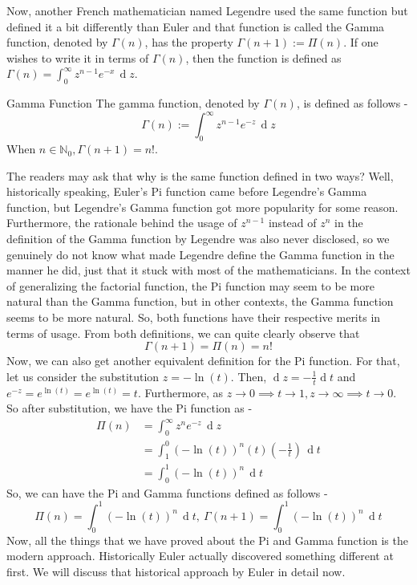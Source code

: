 \noindent Now, another French mathematician named Legendre used the same function but defined it a bit differently than Euler and that function is called the Gamma function, denoted by $\Gamma(n)$, has the property $\Gamma(n+1):=\Pi(n)$. If one wishes to write it in terms of $\Gamma(n)$, then the function is defined as $\Gamma(n)=\int_0^{\infty}z^{n-1}e^{-x}\,\operatorname{d}z$.
\begin{Definition}{Gamma Function}\label{gamma_function}
	The gamma function, denoted by $\Gamma(n)$, is defined as follows - $$\Gamma(n):=\int_0^{\infty} z^{n-1}e^{-z}\,\operatorname{d}z$$ When $n\in\mathbb{N}_0,\Gamma(n+1)=n!$.
\end{Definition}
\noindent The readers may ask that why is the same function defined in two ways? Well, historically speaking, Euler's Pi function came before Legendre's Gamma function, but Legendre's Gamma function got more popularity for some reason. Furthermore, the rationale behind the usage of $z^{n-1}$ instead of $z^n$ in the definition of the Gamma function by Legendre was also never disclosed, so we genuinely do not know what made Legendre define the Gamma function in the manner he did, just that it stuck with most of the mathematicians. In the context of generalizing the factorial function, the Pi function may seem to be more natural than the Gamma function, but in other contexts, the Gamma function seems to be more natural. So, both functions have their respective merits in terms of usage. From both definitions, we can quite clearly observe that $$\boxed{\Gamma(n+1)=\Pi(n)=n!}$$
Now, we can also get another equivalent definition for the Pi function. For that, let us consider the substitution $z=-\ln(t)$. Then, $\operatorname{d}z=-\frac{1}{t}\operatorname{d}t$ and $e^{-z}=e^{\ln(t)}=e^{\ln(t)}=t$. Furthermore, as $z\to0\implies t\to1,z\to\infty\implies t\to 0$. So after substitution, we have the Pi function as -
\begin{align*}
	\Pi(n)&=\int_0^{\infty}z^ne^{-z}\,\operatorname{d}z\\
	&=\int_1^{0}(-\ln(t))^n (t) (-\frac{1}{t})\,\operatorname{d}t\\
	&=\int_0^1(-\ln(t))^n\,\operatorname{d}t
\end{align*}
So, we can have the Pi and Gamma functions defined as follows - $$\boxed{ \Pi(n)= \int_0^1(-\ln(t))^n\,\operatorname{d}t,\ \Gamma(n+1)=\int_0^1(-\ln(t))^{n}\,\operatorname{d}t }$$
Now, all the things that we have proved about the Pi and Gamma function is the modern approach. Historically Euler actually discovered something different at first. We will discuss that historical approach by Euler in detail now.\\
